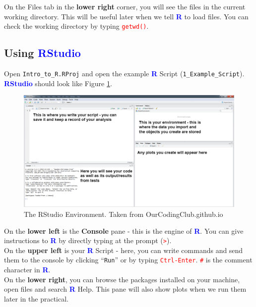 \documentclass[a4paper,12pt]{article}
\newcommand\boldblue[1]{\textcolor{blue}{\textbf{#1}}}
\newcommand\code[1]{\textcolor{red}{\texttt{#1}}}
\begin{document}
On the Files tab in the \textbf{lower right} corner, you will see the files in the current working directory. This will be useful later when we tell \boldblue{R} to load files. You can check the working directory by typing \code{getwd()}.



\subsection {Using \boldblue{RStudio}}

Open \texttt{Intro\_to\_R.RProj} and open the example \boldblue{R} Script (\texttt{1\_Example\_Script}). \boldblue{RStudio} should look like Figure \ref{fig:R_Studio}. 
\\

\begin{figure}[h]
	\centering 
	\includegraphics[width=1.1\textwidth]{figs/R_Studio.png}
	\caption{The RStudio Environment. Taken from OurCodingClub.github.io}
	\label{fig:R_Studio}
\end{figure} 

On the \textbf{lower left} is the \textbf{Console} pane - this is the engine of \boldblue{R}. You can give instructions to \boldblue{R} by directly typing at the prompt (\code{>}). \\

On the \textbf{upper left} is your \boldblue{R} Script - here, you can write commands and send them to the console by clicking ``\texttt{Run}'' or by typing \code{Ctrl-Enter}. \code{\#} is the comment character in \boldblue{R}. \\

On the \textbf{lower right}, you can browse the packages installed on your machine, open files and search \boldblue{R} Help. This pane will also show plots when we run them later in the practical.
\\
\end{document}
